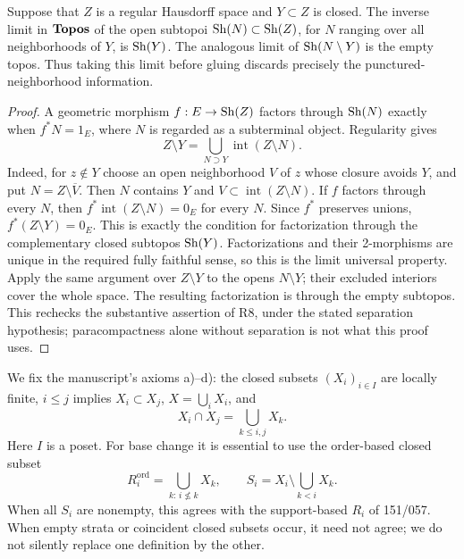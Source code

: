 \begin{result}\label{A1.1}
Suppose that $Z$ is a regular Hausdorff space and $Y\subset Z$ is closed.
The inverse limit in $\mathbf{Topos}$ of the open subtopoi $\operatorname{Sh}(N)\subset\operatorname{Sh}(Z)$,
for $N$ ranging over all neighborhoods of $Y$, is $\operatorname{Sh}(Y)$. The analogous
limit of $\operatorname{Sh}(N\setminus Y)$ is the empty topos. Thus taking this limit
before gluing discards precisely the punctured-neighborhood information.
\end{result}
\begin{proof}
A geometric morphism $f:E\to\operatorname{Sh}(Z)$ factors through $\operatorname{Sh}(N)$ exactly when
$f^*N=1_E$, where $N$ is regarded as a subterminal object. Regularity gives
\[
 Z\setminus Y=\bigcup_{N\supset Y}\operatorname{int}(Z\setminus N).
\]
Indeed, for $z\notin Y$ choose an open neighborhood $V$ of $z$ whose closure
avoids $Y$, and put $N=Z\setminus\overline V$. Then $N$ contains $Y$ and
$V\subset\operatorname{int}(Z\setminus N)$.
If $f$ factors through every $N$, then
$f^*\operatorname{int}(Z\setminus N)=0_E$ for every $N$. Since $f^*$
preserves unions, $f^*(Z\setminus Y)=0_E$. This is exactly the condition for
factorization through the complementary closed subtopos $\operatorname{Sh}(Y)$.
Factorizations and their 2-morphisms are unique in the required fully
faithful sense, so this is the limit universal property. Apply the same
argument over $Z\setminus Y$ to the opens $N\setminus Y$; their excluded
interiors cover the whole space. The resulting factorization is through
the empty subtopos. This rechecks the substantive assertion of R8, under
the stated separation hypothesis; paracompactness alone without separation
is not what this proof uses.
\end{proof}

We fix the manuscript's axioms a)--d): the closed subsets $(X_i)_{i\in I}$
are locally finite, $i\leq j$ implies $X_i\subset X_j$,
$X=\bigcup_iX_i$, and
\[
 X_i\cap X_j=\bigcup_{k\leq i,j}X_k.
\tag{A.1.2}\label{eq:abcd}
\]
Here $I$ is a poset. For base change it is essential to use the order-based
closed subset
\[
 R_i^{\mathrm{ord}}=\bigcup_{k:\,i\nleq k}X_k,
 \qquad S_i=X_i\setminus\bigcup_{k<i}X_k.
\tag{A.1.3}\label{eq:Riord}
\]
When all $S_i$ are nonempty, this agrees with the support-based $R_i$ of
151/057. When empty strata or coincident closed subsets occur, it need not
agree; we do not silently replace one definition by the other.

